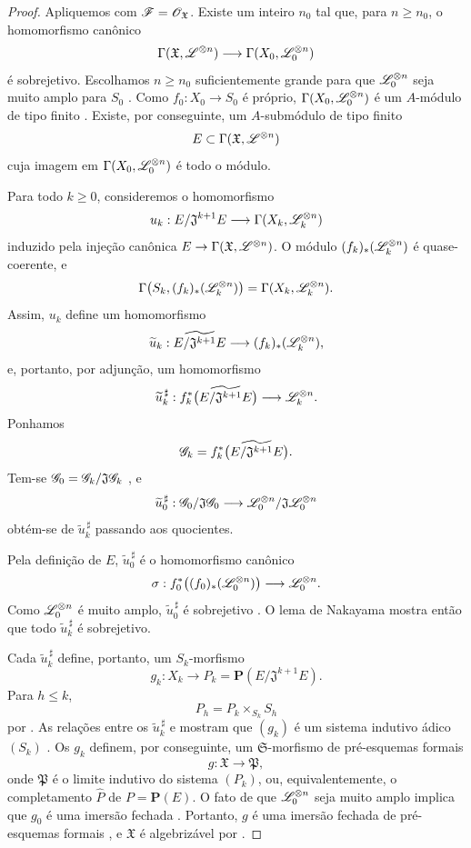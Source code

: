 \begin{proof}
Apliquemos  com
$\mathscr{F}=\mathscr{O}_{\mathfrak{X}}$. Existe um inteiro $n_0$ tal
que, para $n\geq n_0$, o homomorfismo canônico
\[
  \Gamma(\mathfrak{X},\mathscr{L}^{\otimes n})
  \longrightarrow
  \Gamma(X_0,\mathscr{L}_0^{\otimes n})
\]
é sobrejetivo. Escolhamos $n\geq n_0$ suficientemente grande para que
$\mathscr{L}_0^{\otimes n}$ seja muito amplo para $S_0$
. Como
$f_0:X_0\to S_0$ é próprio,
$\Gamma(X_0,\mathscr{L}_0^{\otimes n})$ é um $A$-módulo de tipo finito
. Existe, por conseguinte, um
$A$-submódulo de tipo finito
\[
  E\subset\Gamma(\mathfrak{X},\mathscr{L}^{\otimes n})
\]
cuja imagem em $\Gamma(X_0,\mathscr{L}_0^{\otimes n})$ é todo o
módulo.

Para todo $k\geq0$, consideremos o homomorfismo
\[
  u_k:
  E/\mathfrak{J}^{k+1}E
  \longrightarrow
  \Gamma(X_k,\mathscr{L}_k^{\otimes n})
\]
induzido pela injeção canônica
$E\to\Gamma(\mathfrak{X},\sh{L}^{\otimes n})$. O módulo
$(f_k)_*(\mathscr{L}_k^{\otimes n})$ é quase-coerente, e
\[
  \Gamma\bigl(S_k,(f_k)_*(\mathscr{L}_k^{\otimes n})\bigr)
  =
  \Gamma(X_k,\mathscr{L}_k^{\otimes n}).
\]
Assim, $u_k$ define um homomorfismo
\[
  \widetilde{u}_k:
  \widetilde{E/\mathfrak{J}^{k+1}E}
  \longrightarrow
  (f_k)_*(\mathscr{L}_k^{\otimes n}),
\]
e, portanto, por adjunção, um homomorfismo
\[
  \widetilde{u}_k^{\,\sharp}:
  f_k^*\bigl(\widetilde{E/\mathfrak{J}^{k+1}E}\bigr)
  \longrightarrow
  \mathscr{L}_k^{\otimes n}.
\]
Ponhamos
\[
  \mathscr{G}_k=
  f_k^*\bigl(\widetilde{E/\mathfrak{J}^{k+1}E}\bigr).
\]
Tem-se
$\mathscr{G}_0=\mathscr{G}_k/\mathfrak{J}\mathscr{G}_k$
, e
\[
  \widetilde{u}_0^{\,\sharp}:
  \mathscr{G}_0/\mathfrak{J}\mathscr{G}_0
  \longrightarrow
  \mathscr{L}_0^{\otimes n}/
  \mathfrak{J}\mathscr{L}_0^{\otimes n}
\]
obtém-se de $\widetilde{u}_k^{\,\sharp}$ passando aos
quocientes.

Pela definição de $E$, $\widetilde{u}_0^{\,\sharp}$ é o
homomorfismo canônico
\[
  \sigma:
  f_0^*\bigl((f_0)_*(\mathscr{L}_0^{\otimes n})\bigr)
  \longrightarrow
  \mathscr{L}_0^{\otimes n}.
\]
Como $\mathscr{L}_0^{\otimes n}$ é muito amplo,
$\widetilde{u}_0^{\,\sharp}$ é sobrejetivo
. O lema de Nakayama mostra então que todo
$\widetilde{u}_k^{\,\sharp}$ é sobrejetivo.

Cada $\widetilde{u}_k^{\,\sharp}$ define, portanto,
 um $S_k$-morfismo
\[
  g_k:X_k\longrightarrow
  P_k=\mathbf{P}(E/\mathfrak{J}^{k+1}E).
\]
Para $h\leq k$,
\[
  P_h=P_k\times_{S_k}S_h
\]
por . As relações entre os
$\widetilde{u}_k^{\,\sharp}$ e  mostram que
$(g_k)$ é um sistema indutivo ádico $(S_k)$
. Os $g_k$ definem, por conseguinte, um
$\mathfrak{S}$-morfismo de pré-esquemas formais
\[
  g:\mathfrak{X}\longrightarrow\mathfrak{P},
\]
onde $\mathfrak{P}$ é o limite indutivo do sistema $(P_k)$,
ou, equivalentemente, o completamento $\widehat{P}$ de
$P=\mathbf{P}(E)$. O fato de que
$\mathscr{L}_0^{\otimes n}$ seja muito amplo implica que $g_0$ é uma imersão fechada
. Portanto, $g$ é uma imersão fechada de
pré-esquemas formais , e $\mathfrak{X}$ é algebrizável
por .


\end{proof}
